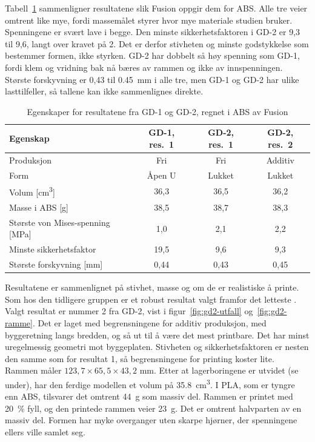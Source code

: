 Tabell~\ref{tab:gd-resultater} sammenligner resultatene slik Fusion oppgir dem for ABS. Alle tre veier omtrent like mye, fordi massemålet styrer hvor mye materiale studien bruker. Spenningene er svært lave i begge. Den minste sikkerhetsfaktoren i GD-2 er 9,3 til 9,6, langt over kravet på 2. Det er derfor stivheten og minste godstykkelse som bestemmer formen, ikke styrken. GD-2 har dobbelt så høy spenning som GD-1, fordi klem og vridning bak nå bæres av rammen og ikke av innspenningen. Største forskyvning er 0,43 til \SI{0,45}{mm} i alle tre, men GD-1 og GD-2 har ulike lasttilfeller, så tallene kan ikke sammenlignes direkte.

\begin{table}[H]
    \centering
    \caption{Egenskaper for resultatene fra GD-1 og GD-2, regnet i ABS av Fusion}
    \label{tab:gd-resultater}
    \small
    \renewcommand{\arraystretch}{1.3}
    \begin{tabular}{|l|c|c|c|}
        \hline
        \textbf{Egenskap} & \textbf{GD-1, res.~1} & \textbf{GD-2, res.~1} & \textbf{GD-2, res.~2} \\
        \hline
        Produksjon & Fri & Fri & Additiv \\
        \hline
        Form & Åpen U & Lukket & Lukket \\
        \hline
        Volum [\si{cm^3}] & 36,3 & 36,5 & 36,2 \\
        \hline
        Masse i ABS [g] & 38,5 & 38,7 & 38,3 \\
        \hline
        Største von Mises-spenning [MPa] & 1,0 & 2,1 & 2,2 \\
        \hline
        Minste sikkerhetsfaktor & 19,5 & 9,6 & 9,3 \\
        \hline
        Største forskyvning [mm] & 0,44 & 0,43 & 0,45 \\
        \hline
    \end{tabular}
\end{table}

Resultatene er sammenlignet på stivhet, masse og om de er realistiske å printe. Som hos den tidligere gruppen er et robust resultat valgt framfor det letteste \parencite{kers_2026}. Valgt resultat er nummer 2 fra GD-2, vist i figur~\ref{fig:gd2-utfall} og~\ref{fig:gd2-ramme}. Det er laget med begrensningene for additiv produksjon, med byggeretning langs bredden, og så ut til å være det mest printbare. Det har minst uregelmessig geometri mot byggeplaten. Stivheten og sikkerhetsfaktoren er nesten den samme som for resultat 1, så begrensningene for printing koster lite. Rammen måler $123{,}7 \times 65{,}5 \times 43{,}2$ mm. Etter at lagerboringene er utvidet (se under), har den ferdige modellen et volum på \SI{35,8}{cm^3}. I PLA, som er tyngre enn ABS, tilsvarer det omtrent \SI{44}{g} som massiv del. Rammen er printet med \SI{20}{\percent} fyll, og den printede rammen veier \SI{23}{g}. Det er omtrent halvparten av en massiv del. Formen har myke overganger uten skarpe hjørner, der spenningene ellers ville samlet seg.

